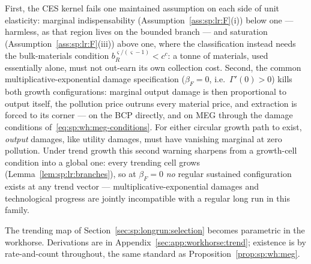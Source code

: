  First, the CES kernel fails one maintained
assumption on each side of unit elasticity: marginal indispensability
(Assumption~\ref{ass:sp:lr:F}(i)) below one --- harmless, as that region lives on the bounded
branch --- and saturation (Assumption~\ref{ass:sp:lr:F}(iii)) above one, where the
classification instead needs the bulk-materials condition
$b_R^{\varsigma/\left(\varsigma-1\right)}<c^c$: a tonne of materials, used essentially alone,
must not out-earn its own collection cost. Second, the common multiplicative-exponential
damage specification ($\beta_F=0$, i.e.\ $\Gamma'\!\left(0\right)>0$) kills both growth
configurations: marginal output damage is then proportional to output itself, the pollution
price outruns every material price, and extraction is forced to its corner --- on the BCP
directly, and on MEG through the damage conditions
of~\eqref{eq:sp:wh:meg-conditions}. For either circular growth path to exist, \emph{output}
damages, like utility damages, must have vanishing marginal at zero pollution. Under trend
growth this second warning sharpens from a growth-cell condition into a global one: every
trending cell grows (Lemma~\ref{lem:sp:lr:branches}), so at $\beta_F=0$ \emph{no} regular
sustained configuration exists at any trend vector --- multiplicative-exponential damages and
technological progress are jointly incompatible with a regular long run in this family.

 The trending map of
Section~\ref{sec:sp:longrun:selection} becomes parametric in the workhorse. Derivations are
in Appendix~\ref{sec:app:workhorse:trend}; existence is by rate-and-count throughout, the
same standard as Proposition~\ref{prop:sp:wh:meg}.


